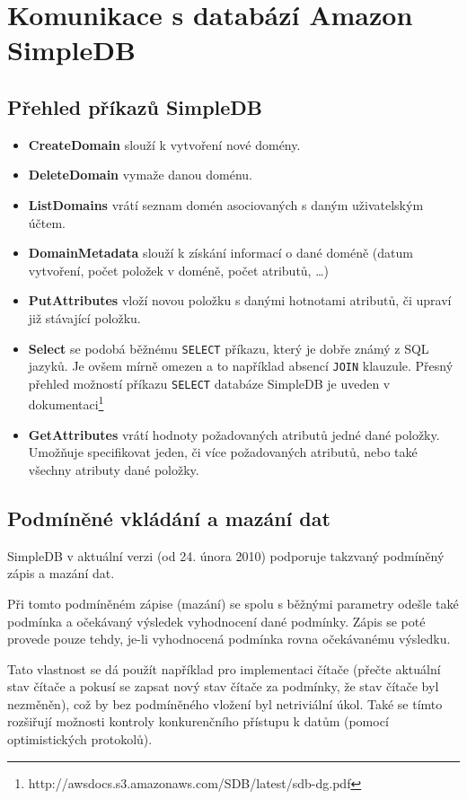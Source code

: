 \documentclass[oneside,12pt,final]{fithesis2}
\begin{document}
\chapter{Komunikace s databází Amazon SimpleDB}
\section{Přehled příkazů SimpleDB}
\begin{itemize}
 \item \textbf{CreateDomain} slouží k vytvoření nové domény.
 \item \textbf{DeleteDomain} vymaže danou doménu.
 \item \textbf{ListDomains} vrátí seznam domén asociovaných s daným uživatelským účtem.
 \item \textbf{DomainMetadata} slouží k získání informací o dané doméně (datum vytvoření, počet položek v doméně, počet atributů, \dots)
 \item \textbf{PutAttributes} vloží novou položku s danými hotnotami atributů, či upraví již stávající položku.
 \item \textbf{Select} se podobá běžnému \verb<SELECT< příkazu, který je dobře známý z SQL jazyků. Je ovšem mírně omezen a to například absencí \verb<JOIN< klauzule. Přesný přehled možností příkazu \verb<SELECT< databáze SimpleDB je uveden v dokumentaci\footnote{http://awsdocs.s3.amazonaws.com/SDB/latest/sdb-dg.pdf}
 \item \textbf{GetAttributes} vrátí hodnoty požadovaných atributů jedné dané položky. Umožňuje specifikovat jeden, či více požadovaných atributů, nebo také všechny atributy dané položky.
\end{itemize}

\section{Podmíněné vkládání a mazání dat}
SimpleDB v aktuální verzi (od 24. února 2010) podporuje takzvaný podmíněný zápis a mazání dat. 

Při tomto podmíněném zápise (mazání) se spolu s běžnými parametry odešle také podmínka a očekávaný výsledek vyhodnocení dané podmínky. Zápis se poté provede pouze tehdy, je-li vyhodnocená podmínka rovna očekávanému výsledku.

Tato vlastnost se dá použít například pro implementaci čítače (přečte aktuální stav čítače a pokusí se zapsat nový stav čítače za podmínky, že stav čítače byl nezměněn), což by bez podmíněného vložení byl netriviální úkol. Také se tímto rozšiřují možnosti kontroly konkurenčního přístupu k datům (pomocí optimistických protokolů).
\end{document}
